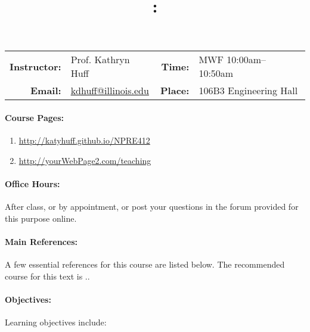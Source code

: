 \documentclass[11pt, a4paper]{article}
\title{\CourseNumber: \CourseTitle\\}
\author{\CourseUniversity}
\date{\CourseSemester \CourseYear}
\makeatletter
\newcommand{\CourseNumber}{NPRE412}
\newcommand{\CourseInstructor}{Prof. Kathryn Huff\xspace}%
\newcommand{\CourseDays}{MWF\xspace}%
\newcommand{\CourseStart}{10:00am\xspace}%
\newcommand{\CourseEnd}{10:50am\xspace}%
\newcommand{\CourseInstructorEmail}{kdhuff@illinois.edu}
\newcommand{\CourseRoom}{106B3\xspace}%
\newcommand{\CourseBuilding}{Engineering Hall\xspace}%
\makeatother
\begin{document}
\maketitle
\renewcommand{\arraystretch}{2}
\begin{center}
\begin{table}[h]
\begin{tabularx}{\textwidth}{rXrX}
\hline
\textbf{Instructor:} & \CourseInstructor & \textbf{Time:} & \CourseDays \CourseStart -- \CourseEnd \\
\textbf{Email:} &  \href{mailto:\CourseInstructorEmail}{\CourseInstructorEmail} & \textbf{Place:} & \CourseRoom \CourseBuilding\\
\hline
\end{tabularx}
\end{table}
\end{center}

\paragraph{Course Pages:}
\begin{enumerate}
\item \url{http://katyhuff.github.io/\CourseNumber}
\item \url{http://yourWebPage2.com/teaching}
\end{enumerate}

\paragraph{Office Hours:} After class, or by appointment, or post your 
questions in the forum provided for this purpose online.

\paragraph{Main References:}
A few essential references for this course are listed below. The recommended 
course for this text is \cite{tsoulfanidis_nuclear_2013}..
\nocite{*}

\renewcommand{\refname}{\normalfont\selectfont\normalsize}\vspace{-1cm} 


\paragraph{Objectives:} 

Learning objectives include:
\end{document}
